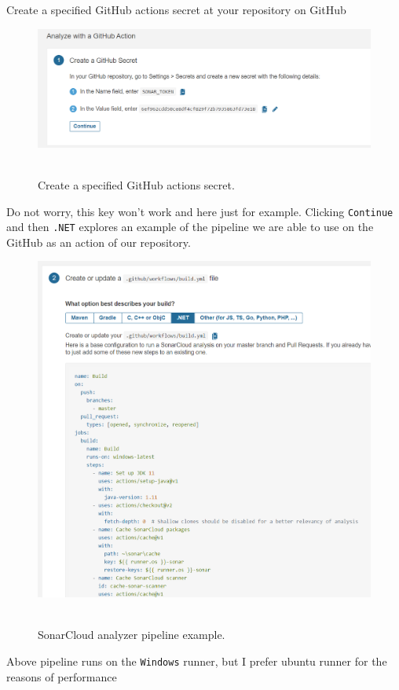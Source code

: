 Create a specified GitHub actions secret at your repository on GitHub
\begin{figure}[H]
    \centering
    \includegraphics[width=1\textwidth]{img/08_set_github_actions_secret}
    ~\caption{Create a specified GitHub actions secret.}\label{fig:figure8}
\end{figure}
Do not worry, this key won't work and here just for example.
Clicking \texttt{Continue} and then \texttt{.NET} explores an example of the pipeline we are able to use
on the GitHub as an action of our repository.
\begin{figure}[H]
    \centering
    \includegraphics[width=1\textwidth]{img/09_pipeline_example}
    ~\caption{SonarCloud analyzer pipeline example.}\label{fig:figure9}
\end{figure}
Above pipeline runs on the \texttt{Windows} runner, but I prefer ubuntu runner for the reasons of performance
